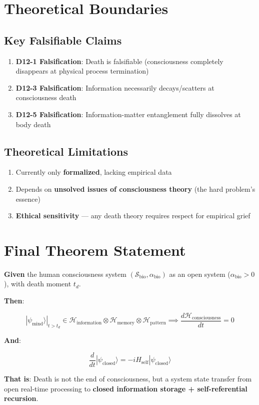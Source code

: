 \documentclass[12pt,a4paper]{article}
\newcommand{\calS}{\mathcal{S}}
\newcommand{\Hc}{\mathcal{H}_{\text{consciousness}}}
\newcommand{\alphabio}{\alpha_{\text{bio}}}
\newcommand{\psimind}{|\psi_{\text{mind}}\rangle}
\newcommand{\Hinf}{\mathcal{H}_{\text{information}}}
\newcommand{\Hmem}{\mathcal{H}_{\text{memory}}}
\newcommand{\Hpat}{\mathcal{H}_{\text{pattern}}}
\newcommand{\Hself}{H_{\text{self}}}
\begin{document}
\section{Theoretical Boundaries}

\subsection{Key Falsifiable Claims}
\begin{enumerate}
    \item \textbf{D12-1 Falsification}: Death is falsifiable (consciousness completely disappears at physical process termination)
    \item \textbf{D12-3 Falsification}: Information necessarily decays/scatters at consciousness death
    \item \textbf{D12-5 Falsification}: Information-matter entanglement fully dissolves at body death
\end{enumerate}

\subsection{Theoretical Limitations}
\begin{enumerate}
    \item Currently only \textbf{formalized}, lacking empirical data
    \item Depends on \textbf{unsolved issues of consciousness theory} (the hard problem's essence)
    \item \textbf{Ethical sensitivity} --- any death theory requires respect for empirical grief
\end{enumerate}

\section{Final Theorem Statement}

\begin{tcolorbox}[colback=blue!5!white,colframe=blue!75!black,title=D12 Isolated System Theorem]
\textbf{Given} the human consciousness system $(\calS_{\text{bio}}, \alphabio)$ as an open system ($\alphabio > 0$), with death moment $t_d$.

\textbf{Then}:

$$\boxed{\psimind|_{t > t_d} \in \Hinf \otimes \Hmem \otimes \Hpat \implies \frac{d\Hc}{dt} = 0}$$

\textbf{And}:

$$\frac{d}{dt} |\psi_{\text{closed}}\rangle = -i \Hself |\psi_{\text{closed}}\rangle$$

\textbf{That is}: Death is not the end of consciousness, but a system state transfer from open real-time processing to \textbf{closed information storage + self-referential recursion}.
\end{tcolorbox}
\end{document}
